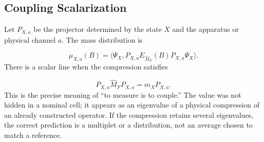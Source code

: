 \subsection{Coupling Scalarization}
Let \(P_{X,a}\) be the projector determined by the state \(X\) and the apparatus or physical channel \(a\). The mass distribution is

\[
\mu_{X,a}(B)
=\langle\Psi_X,
P_{X,a}E_{\widehat M_F}(B)P_{X,a}\Psi_X\rangle.
\]
There is a scalar line when the compression satisfies

\[
P_{X,a}\widehat M_FP_{X,a}=m_XP_{X,a}.
\]
This is the precise meaning of “to measure is to couple.” The value was not hidden in a nominal cell; it appears as an eigenvalue of a physical compression of an already constructed operator. If the compression retains several eigenvalues, the correct prediction is a multiplet or a distribution, not an average chosen to match a reference.



